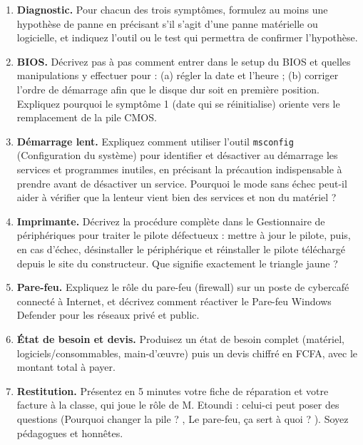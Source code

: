 \documentclass[11pt]{article}
\newcommand{\cle}[1]{{\popxbold\color{popdark}#1}}
\newcounter{popsec}
\newcounter{popsub}
\newcommand{\courssub}[1]{%
  \stepcounter{popsub}%
  \par\vspace{9pt}\noindent{\popxbold\fontsize{11.5}{13}\selectfont\color{popink}{\color{poporange}\thepopsec.\thepopsub}\hspace{6pt}#1}\par\nopagebreak\vspace{4pt}
}
\begin{document}
\begin{enumerate}
\item \textbf{Diagnostic.} Pour chacun des trois symptômes, formulez au moins une \cle{hypothèse de panne} en précisant s'il s'agit d'une panne matérielle ou logicielle, et indiquez l'outil ou le test qui permettra de confirmer l'hypothèse.
\item \textbf{BIOS.} Décrivez pas à pas comment entrer dans le \cle{setup du BIOS} et quelles manipulations y effectuer pour : (a) régler la date et l'heure ; (b) corriger l'\cle{ordre de démarrage} afin que le disque dur soit en première position. Expliquez pourquoi le symptôme 1 (date qui se réinitialise) oriente vers le remplacement de la \cle{pile CMOS}.
\item \textbf{Démarrage lent.} Expliquez comment utiliser l'outil \texttt{msconfig} (Configuration du système) pour identifier et désactiver au démarrage les \cle{services} et programmes inutiles, en précisant la précaution indispensable à prendre avant de désactiver un service. Pourquoi le \cle{mode sans échec} peut-il aider à vérifier que la lenteur vient bien des services et non du matériel ?
\item \textbf{Imprimante.} Décrivez la procédure complète dans le \cle{Gestionnaire de périphériques} pour traiter le pilote défectueux : mettre à jour le pilote, puis, en cas d'échec, désinstaller le périphérique et réinstaller le pilote téléchargé depuis le site du constructeur. Que signifie exactement le triangle jaune ?
\item \textbf{Pare-feu.} Expliquez le rôle du \cle{pare-feu} (firewall) sur un poste de cybercafé connecté à Internet, et décrivez comment réactiver le Pare-feu Windows Defender pour les réseaux privé et public.
\item \textbf{État de besoin et devis.} Produisez un \cle{état de besoin} complet (matériel, logiciels/consommables, main-d'œuvre) puis un devis chiffré en FCFA, avec le montant total à payer.
\item \textbf{Restitution.} Présentez en 5 minutes votre fiche de réparation et votre facture à la classe, qui joue le rôle de M. Etoundi : celui-ci peut poser des questions (\og Pourquoi changer la pile ? \fg, \og Le pare-feu, ça sert à quoi ? \fg). Soyez pédagogues et honnêtes.
\end{enumerate}

\courssub{Ressources à mobiliser}
\end{document}
